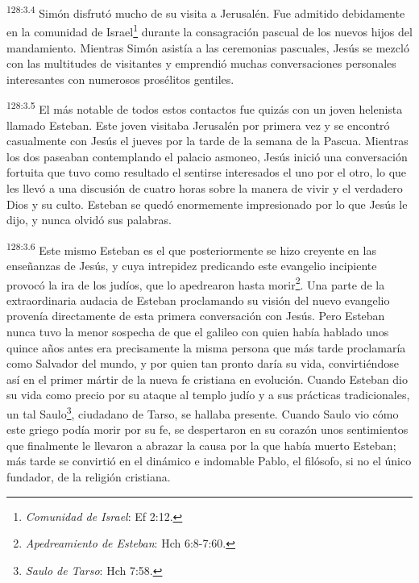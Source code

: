 \par
\textsuperscript{128:3.4} Simón disfrutó mucho de su visita a Jerusalén. Fue admitido debidamente en la comunidad de Israel\footnote{\textit{Comunidad de Israel}: Ef 2:12.} durante la consagración pascual de los nuevos hijos del mandamiento. Mientras Simón asistía a las ceremonias pascuales, Jesús se mezcló con las multitudes de visitantes y emprendió muchas conversaciones personales interesantes con numerosos prosélitos gentiles.

\par
\textsuperscript{128:3.5} El más notable de todos estos contactos fue quizás con un joven helenista llamado Esteban. Este joven visitaba Jerusalén por primera vez y se encontró casualmente con Jesús el jueves por la tarde de la semana de la Pascua. Mientras los dos paseaban contemplando el palacio asmoneo, Jesús inició una conversación fortuita que tuvo como resultado el sentirse interesados el uno por el otro, lo que les llevó a una discusión de cuatro horas sobre la manera de vivir y el verdadero Dios y su culto. Esteban se quedó enormemente impresionado por lo que Jesús le dijo, y nunca olvidó sus palabras.

\par
\textsuperscript{128:3.6} Este mismo Esteban es el que posteriormente se hizo creyente en las enseñanzas de Jesús, y cuya intrepidez predicando este evangelio incipiente provocó la ira de los judíos, que lo apedrearon hasta morir\footnote{\textit{Apedreamiento de Esteban}: Hch 6:8-7:60.}. Una parte de la extraordinaria audacia de Esteban proclamando su visión del nuevo evangelio provenía directamente de esta primera conversación con Jesús. Pero Esteban nunca tuvo la menor sospecha de que el galileo con quien había hablado unos quince años antes era precisamente la misma persona que más tarde proclamaría como Salvador del mundo, y por quien tan pronto daría su vida, convirtiéndose así en el primer mártir de la nueva fe cristiana en evolución. Cuando Esteban dio su vida como precio por su ataque al templo judío y a sus prácticas tradicionales, un tal Saulo\footnote{\textit{Saulo de Tarso}: Hch 7:58.}, ciudadano de Tarso, se hallaba presente. Cuando Saulo vio cómo este griego podía morir por su fe, se despertaron en su corazón unos sentimientos que finalmente le llevaron a abrazar la causa por la que había muerto Esteban; más tarde se convirtió en el dinámico e indomable Pablo, el filósofo, si no el único fundador, de la religión cristiana.

